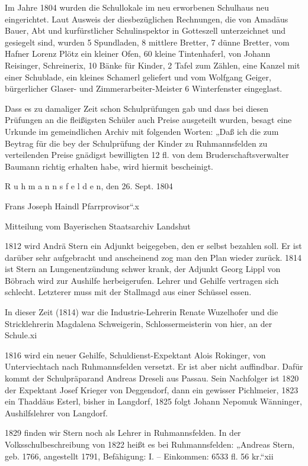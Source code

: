 \documentclass[12pt,a4paper]{book}
\begin{document}
Im Jahre 1804 wurden die Schullokale im neu erworbenen Schulhaus neu
eingerichtet. Laut Ausweis der diesbezüglichen Rechnungen, die von Amadäus
Bauer, Abt und kurfürstlicher Schulinspektor in Gotteszell unterzeichnet und
gesiegelt sind, wurden 5 Spundladen, 8 mittlere Bretter, 7 dünne Bretter, vom
Hafner Lorenz Plötz ein kleiner Ofen, 60 kleine Tintenhaferl, von Johann
Reisinger, Schreinerix, 10 Bänke für Kinder, 2 Tafel zum Zählen, eine Kanzel mit
einer Schublade, ein kleines Schamerl geliefert und vom Wolfgang Geiger,
bürgerlicher Glaser- und Zimmerarbeiter-Meister 6 Winterfenster eingeglast.

Dass es zu damaliger Zeit schon Schulprüfungen gab und dass bei diesen Prüfungen
an die fleißigsten Schüler auch Preise ausgeteilt wurden, besagt eine Urkunde im
gemeindlichen Archiv mit folgenden Worten: „Daß ich die zum Beytrag für die bey
der Schulprüfung der Kinder zu Ruhmannsfelden zu verteilenden Preise gnädigst
bewilligten 12 fl. von dem Bruderschaftsverwalter Baumann richtig erhalten habe,
wird hiermit bescheinigt.

 R u h m a n n s f e l d e n, den 26. Sept. 1804

    Frans Joseph Haindl Pfarrprovisor“.x

Mitteilung vom Bayerischen Staatsarchiv Landshut

1812 wird Andrä Stern ein Adjunkt beigegeben, den er selbst bezahlen soll. Er
ist darüber sehr aufgebracht und anscheinend zog man den Plan wieder zurück.
1814 ist Stern an Lungenentzündung schwer krank, der Adjunkt Georg Lippl von
Böbrach wird zur Aushilfe herbeigerufen. Lehrer und Gehilfe vertragen sich
schlecht. Letzterer muss mit der Stallmagd aus einer Schüssel essen.

In dieser Zeit (1814) war die Industrie-Lehrerin Renate Wuzelhofer und die
Stricklehrerin Magdalena Schweigerin, Schlossermeisterin von hier, an der
Schule.xi

1816 wird ein neuer Gehilfe, Schuldienst-Expektant Alois Rokinger, von
Unterviechtach nach Ruhmannsfelden versetzt. Er ist aber nicht auffindbar. Dafür
kommt der Schulpräparand Andreas Dreseli aus Passau. Sein Nachfolger ist 1820
der Expektant Josef Krieger von Deggendorf, dann ein gewisser Pichlmeier, 1823
ein Thaddäus Esterl, bisher in Langdorf, 1825 folgt Johann Nepomuk Wänninger,
Aushilfslehrer von Langdorf.

1829 finden wir Stern noch als Lehrer in Ruhmannsfelden. In der
Volksschulbeschreibung von 1822 heißt es bei Ruhmannsfelden: „Andreas Stern,
geb. 1766, angestellt 1791, Befähigung: I. – Einkommen: 6533 fl. 56 kr.“xii
\end{document}
